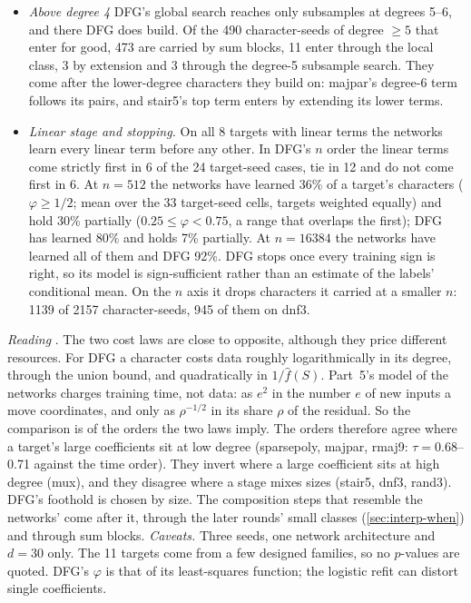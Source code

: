 \begin{itemize}
\item \emph{Above degree 4} DFG's global search reaches only subsamples at degrees 5--6, and there DFG does build. Of the 490 character-seeds of degree $\ge5$ that enter for good, 473 are carried by sum blocks, 11 enter through the local class, 3 by extension and 3 through the degree-5 subsample search. They come after the lower-degree characters they build on: majpar's degree-6 term follows its pairs, and stair5's top term enters by extending its lower terms.
\item \emph{Linear stage and stopping.} On all 8 targets with linear terms the networks learn every linear term before any other. In DFG's $n$ order the linear terms come strictly first in 6 of the 24 target-seed cases, tie in 12 and do not come first in 6. At $n=512$ the networks have learned 36\% of a target's characters ($\varphi\ge1/2$; mean over the 33 target-seed cells, targets weighted equally) and hold 30\% partially ($0.25\le\varphi<0.75$, a range that overlaps the first); DFG has learned 80\% and holds 7\% partially. At $n=16384$ the networks have learned all of them and DFG 92\%. DFG stops once every training sign is right, so its model is sign-sufficient rather than an estimate of the labels' conditional mean. On the $n$ axis it drops characters it carried at a smaller $n$: 1139 of 2157 character-seeds, 945 of them on dnf3.
\end{itemize}

\emph{Reading} . The two cost laws are close to opposite, although they price different resources. For DFG a character costs data roughly logarithmically in its degree, through the union bound, and quadratically in $1/\hat f(S)$. Part~5's model of the networks charges training time, not data: as $e^2$ in the number $e$ of new inputs a move coordinates, and only as $\rho^{-1/2}$ in its share $\rho$ of the residual. So the comparison is of the orders the two laws imply. The orders therefore agree where a target's large coefficients sit at low degree (sparsepoly, majpar, rmaj9: $\tau=0.68$--0.71 against the time order). They invert where a large coefficient sits at high degree (mux), and they disagree where a stage mixes sizes (stair5, dnf3, rand3). DFG's foothold is chosen by size. The composition steps that resemble the networks' come after it, through the later rounds' small classes (\cref{sec:interp-when}) and through sum blocks.
\emph{Caveats.} Three seeds, one network architecture and $d=30$ only. The 11 targets come from a few designed families, so no $p$-values are quoted. DFG's $\varphi$ is that of its least-squares function; the logistic refit can distort single coefficients.

